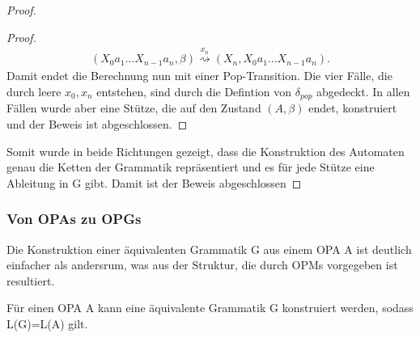 \begin{proof}
\begin{proof}
\begin{eqnarray*}
(X_0a_1...X_{n-1}a_n, \beta) \stackrel{x_n}{\rightsquigarrow} (X_n, X_0a_1...X_{n-1}a_n).
\end{eqnarray*}
Damit endet die Berechnung nun mit einer Pop-Transition. Die vier Fälle, die durch leere $x_0, x_n$ entstehen, sind durch die Defintion von $\delta_{pop}$ abgedeckt. In allen Fällen wurde aber eine Stütze, die auf den Zustand $(A, \beta)$ endet, konstruiert und der Beweis ist abgeschlossen.
\end{proof}
Somit wurde in beide Richtungen gezeigt, dass die Konstruktion des Automaten genau die Ketten der Grammatik repräsentiert und es für jede Stütze eine Ableitung in G gibt. Damit ist der Beweis abgeschlossen 
\end{proof}


\subsubsection{Von OPAs zu OPGs}
Die Konstruktion einer äquivalenten Grammatik G aus einem OPA A ist deutlich einfacher als andersrum, was aus der Struktur, die durch OPMs vorgegeben ist resultiert.
\begin{lemma}
Für einen OPA A kann eine äquivalente Grammatik G konstruiert werden, sodass L(G)=L(A) gilt.
\end{lemma}
